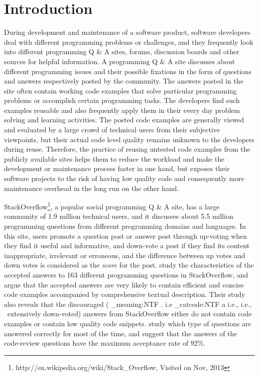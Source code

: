\documentclass{sig-alternate}
\makeatletter
\newcommand\latinabbrev[1]{
  \peek_meaning:NTF . {%
    #1\@}%
  { \peek_catcode:NTF a {%
      #1., \@ }%
    {#1., \@}}}
\def\ie{\latinabbrev{i.e}}
\makeatother
\begin{document}



\section{Introduction}
During development and maintenance of a software product, software developers deal with different programming problems or challenges, and they frequently look into different programming Q \& A sites, forums, discussion boards and other sources for helpful information. A programming Q \& A site discusses about different programming issues and their possible fixations in the form of questions and answers respectively posted by the community. The answers posted in the site often contain working code examples that solve particular programming problems or accomplish certain programming tasks. The developers find such examples reusable and also frequently apply them in their every day problem solving and learning activities. The posted code examples are generally viewed and evaluated by a large crowd of technical users from their subjective viewpoints,  but their actual code level quality remains unknown to the developers during reuse. Therefore, the practice of reusing untested code examples from the publicly available sites helps them to reduce the workload and make the development or maintenance process faster in one hand, but exposes their software projects to the risk of having low quality code and consequently more maintenance overhead in the long run on the other hand.

StackOverflow\footnote{http://en.wikipedia.org/wiki/Stack\_Overflow, Visited on Nov, 2013}, a popular social programming Q \& A site,  has a large community of 1.9 million technical users, and it discusses about 5.5 million programming questions from different programming domains and languages. In this site, users promote a question post or answer post through up-voting when they find it useful and informative, and down-vote a post if they find its content inappropriate, irrelevant or erroneous, and the difference between up votes and down votes is considered as the \emph{score} for the post. \citet{nasehi} study the characteristics of the accepted answers to 163 different programming questions in StackOverflow, and argue that  the accepted answers are very likely to contain efficient and concise code examples accompanied by comprehensive textual description. Their study also reveals that the discouraged (\ie\ extensively down-voted) answers from StackOverflow either do not contain code examples or contain low quality code snippets. \citet{nier} study which type of questions are answered correctly for most of the time, and suggest that the answers of the code-review questions have the maximum acceptance rate of 92\%. 
\end{document}
